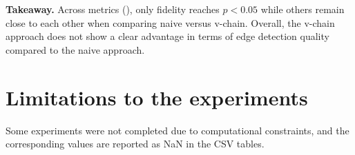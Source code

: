 \textbf{Takeaway.} Across metrics (), only fidelity reaches $p<0.05$ while others remain close to each other when comparing naive versus v-chain. Overall, the v-chain approach does not show a clear advantage in terms of edge detection quality compared to the naive approach.
\FloatBarrier

\section{Limitations to the experiments}
\label{sec:res-limitations}
Some experiments were not completed due to computational constraints, and the corresponding values are reported as NaN in the CSV tables.